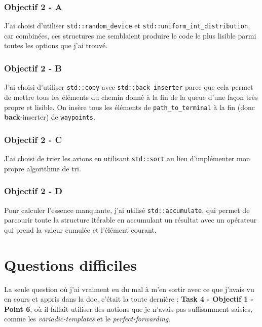 \documentclass{article}
\begin{document}
\subsubsection*{\textbf{Objectif 2 - A}}

J'ai choisi d'utiliser \texttt{std::random\_device} et \texttt{std::uniform\_int\_distribution}, car combinées, ces structures me semblaient produire le code le plus lisible parmi toutes les options que j'ai trouvé.

\subsubsection*{\textbf{Objectif 2 - B}}

J'ai choisi d'utiliser \texttt{std::copy} avec \texttt{std::back\_inserter} parce que cela permet de mettre tous les éléments du chemin donné à la fin de la queue d'une façon très propre et lisible. On insère tous les éléments de \texttt{path\_to\_terminal} à la fin (donc \textbf{back}-inserter) de \texttt{waypoints}.

\subsubsection*{\textbf{Objectif 2 - C}}

J'ai choisi de trier les avions en utilisant \texttt{std::sort} au lieu d'implémenter mon propre algorithme de tri.

\subsubsection*{\textbf{Objectif 2 - D}}

Pour calculer l'essence manquante, j'ai utilisé \texttt{std::accumulate}, qui permet de parcourir toute la structure itérable en accumulant un résultat avec un opérateur qui prend la valeur cumulée et l'élément courant.

\section{Questions difficiles}

La seule question où j'ai vraiment eu du mal à m'en sortir avec ce que j'avais vu en cours et appris dans la doc, c'était la toute dernière : \textbf{Task 4 - Objectif 1 - Point 6}, où il fallait utiliser des notions que je n'avais pas suffisamment saisies, comme les \textit{variadic-templates} et le \textit{perfect-forwarding}.
\end{document}
